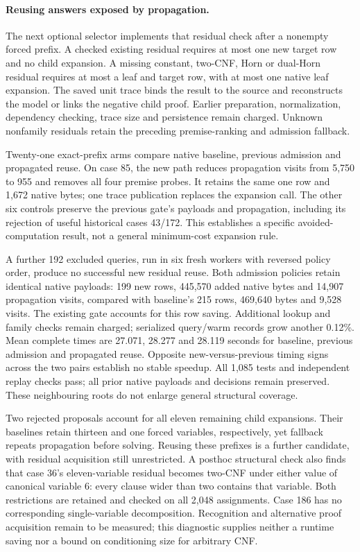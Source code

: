 \documentclass[11pt,a4paper]{article}
\numberwithin{equation}{section}
\theoremstyle{plain}
\theoremstyle{definition}
\theoremstyle{remark}
\begin{document}
\paragraph{Reusing answers exposed by propagation.}
The next optional selector implements that residual check after a nonempty
forced prefix. A checked existing residual requires at most one new target row
and no child expansion. A missing constant, two-CNF, Horn or dual-Horn residual
requires at most a leaf and target row, with at most one native leaf expansion.
The saved unit trace binds the result to the source and reconstructs the model
or links the negative child proof. Earlier preparation, normalization, dependency
checking, trace size and persistence remain charged. Unknown nonfamily residuals
retain the preceding premise-ranking and admission fallback.

Twenty-one exact-prefix arms compare native baseline, previous admission and
propagated reuse. On case 85, the new path reduces propagation visits from
5,750 to 955 and removes all four premise probes. It retains the same one row
and 1,672 native bytes; one trace publication replaces the expansion call.
The other six controls preserve the previous gate's payloads and propagation,
including its rejection of useful historical cases 43/172. This establishes a
specific avoided-computation result, not a general minimum-cost expansion rule.

A further 192 excluded queries, run in six fresh workers with reversed policy
order, produce no successful new residual reuse. Both admission policies retain
identical native payloads: 199 new rows, 445,570 added native bytes and 14,907
propagation visits, compared with baseline's 215 rows, 469,640 bytes and 9,528
visits. The existing gate accounts for this row saving. Additional lookup and
family checks remain charged; serialized query/warm records grow another
0.12\%. Mean complete times are 27.071, 28.277 and 28.119 seconds for baseline,
previous admission and propagated reuse. Opposite new-versus-previous timing
signs across the two pairs establish no stable speedup. All 1,085 tests and
independent replay checks pass; all prior native payloads and decisions remain
preserved. These neighbouring roots do not enlarge general structural coverage.

Two rejected proposals account for all eleven remaining child expansions.
Their baselines retain thirteen and one forced variables, respectively, yet
fallback repeats propagation before solving. Reusing these prefixes is a further
candidate, with residual acquisition still unrestricted. A posthoc structural
check also finds that case 36's eleven-variable residual becomes two-CNF under
either value of canonical variable 6: every clause wider than two contains that
variable. Both restrictions are retained and checked on all 2,048 assignments.
Case 186 has no corresponding single-variable decomposition. Recognition and
alternative proof acquisition remain to be measured; this diagnostic supplies
neither a runtime saving nor a bound on conditioning size for arbitrary CNF.
\end{document}
